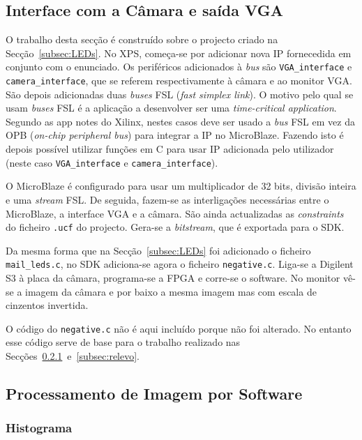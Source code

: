 \documentclass[a4paper,12pt]{article}
\begin{document}
\subsection{Interface com a Câmara e saída VGA}

O trabalho desta secção é construído sobre o projecto criado na Secção~\ref{subsec:LEDs}. No XPS, começa-se por adicionar nova IP fornecedida em conjunto com o enunciado. Os periféricos adicionados à \textit{bus} são \texttt{VGA\_interface} e \texttt{camera\_interface}, que se referem respectivamente à câmara e ao monitor VGA. São depois adicionadas duas \textit{buses} FSL (\textit{fast simplex link}). O motivo pelo qual se usam \textit{buses} FSL é a aplicação a desenvolver ser uma \textit{time-critical application}. Segundo as app notes do Xilinx, nestes casos deve ser usado a \textit{bus} FSL em vez da OPB (\textit{on-chip peripheral bus}) para integrar a IP no MicroBlaze. Fazendo isto é depois possível utilizar funções em C para usar IP adicionada pelo utilizador (neste caso \texttt{VGA\_interface} e \texttt{camera\_interface}).

O MicroBlaze é configurado para usar um multiplicador de 32 bits, divisão inteira e uma \textit{stream} FSL. De seguida, fazem-se as interligações necessárias entre o MicroBlaze, a interface VGA e a câmara. São ainda actualizadas as \textit{constraints} do ficheiro \texttt{.ucf} do projecto. Gera-se a \textit{bitstream}, que é exportada para o SDK.

Da mesma forma que na Secção~\ref{subsec:LEDs} foi adicionado o ficheiro \texttt{mail\_leds.c}, no SDK adiciona-se agora o ficheiro \texttt{negative.c}. Liga-se a Digilent S3 à placa da câmara, programa-se a FPGA e corre-se o software. No monitor vê-se a imagem da câmara e por baixo a mesma imagem mas com escala de cinzentos invertida.

O código do \texttt{negative.c} não é aqui incluído porque não foi alterado. No entanto esse código serve de base para o trabalho realizado nas Secções~\ref{subsec:histograma}~e~\ref{subsec:relevo}.

\subsection{Processamento de Imagem por Software}
\subsubsection{Histograma}
\label{subsec:histograma}
\end{document}
